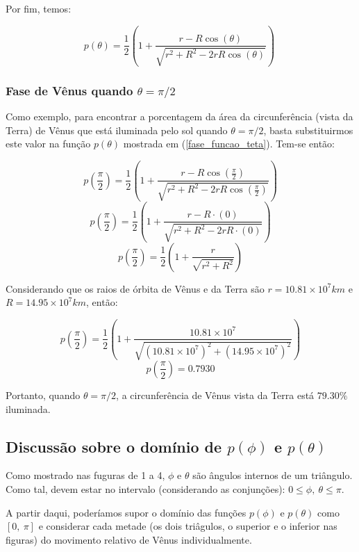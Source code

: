 \documentclass[a4paper, 12pt]{article}
\begin{document}
Por fim, temos:

\begin{equation}\label{fase_funcao_teta}
    \boxed{p\left(\theta \right)=\frac{1}{2}\left(1+\frac{r-R\cos \left(\theta \right)}{\sqrt{r^2+R^2-2rR\cos \left(\theta \right)}}\right)\ }
\end{equation}



\subsubsection{Fase de Vênus quando $\theta=\pi /2$}

Como exemplo, para encontrar a porcentagem da área da circunferência (vista da Terra) de Vênus que está iluminada pelo sol quando $\theta=\pi /2$, basta substituirmos este valor na função $p\left(\theta \right)$ mostrada em (\ref{fase_funcao_teta}). Tem-se então:

$$p\left(\frac{\pi }{2}\right)=\frac{1}{2}\left(1+\frac{r-R\cos \left(\frac{\pi }{2}\right)}{\sqrt{r^2+R^2-2rR\cos \left(\frac{\pi }{2}\right)}}\right)$$
$$p\left(\frac{\pi }{2}\right)=\frac{1}{2}\left(1+\frac{r-R\cdot \left(0\right)}{\sqrt{r^2+R^2-2rR\cdot \left(0\right)}}\right)$$
$$p\left(\frac{\pi }{2}\right)=\frac{1}{2}\left(1+\frac{r}{\sqrt{r^2+R^2}}\right)$$

Considerando que os raios de órbita de Vênus e da Terra são $r=10.81\times 10^7km$ e $R=14.95\times 10^7km$, então:

$$p\left(\frac{\pi }{2}\right)=\frac{1}{2}\left(1+\frac{10.81\times 10^7}{\sqrt{\left(10.81\times 10^7\right)^2+\left(14.95\times 10^7\right)^2}}\right)$$
$$\boxed{p\left(\frac{\pi }{2}\right)=0.7930}$$

Portanto, quando $\theta=\pi /2$, a circunferência de Vênus vista da Terra está $79.30\%$ iluminada.

\subsection{Discussão sobre o domínio de $p\left(\phi \right)$ e $p\left(\theta \right)$}
Como mostrado nas fuguras de 1 a 4, $\phi$ e $\theta$ são ângulos internos de um triângulo. Como tal, devem estar no intervalo (considerando as conjunções): $0\le\phi,\ \theta\le\pi$.

A partir daqui, poderíamos supor o domínio das funções $p\left(\phi \right)$ e $p\left(\theta \right)$ como $[0,\ \pi]$ e considerar cada metade (os dois triâgulos, o superior e o inferior nas figuras) do movimento relativo de Vênus individualmente.
\end{document}
